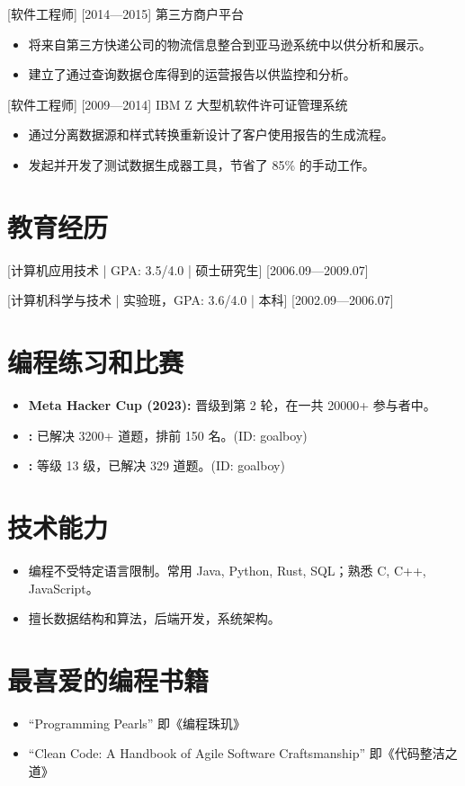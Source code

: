 \documentclass{resume}
\begin{document}
[软件工程师]
[2014—2015]
第三方商户平台
\begin{itemize}
  \item 将来自第三方快递公司的物流信息整合到亚马逊系统中以供分析和展示。
  \item 建立了通过查询数据仓库得到的运营报告以供监控和分析。
\end{itemize}

[软件工程师]
[2009—2014]
IBM Z 大型机软件许可证管理系统
\begin{itemize}
  \item 通过分离数据源和样式转换重新设计了客户使用报告的生成流程。
  \item 发起并开发了测试数据生成器工具，节省了 85\% 的手动工作。
\end{itemize}

\section{教育经历}
[\textnormal{计算机应用技术 | GPA: 3.5/4.0 |} 硕士研究生]
[2006.09—2009.07]

[\textnormal{计算机科学与技术 | 实验班，GPA: 3.6/4.0 |} 本科]
[2002.09—2006.07]

\section{编程练习和比赛}
\begin{itemize}
  \item \textbf{Meta Hacker Cup (2023):} 晋级到第 2 轮，在一共 20000+ 参与者中{}。
  \item \textbf{:} 已解决 3200+ 道题，排前 150 名。(ID: goalboy)
  \item \textbf{:} 等级 13 级，已解决 329 道题。(ID: goalboy)
\end{itemize}

\section{技术能力}
\begin{itemize}
  \item 编程不受特定语言限制。常用 Java, Python, Rust, SQL；熟悉 C, C++, JavaScript。
  \item 擅长数据结构和算法，后端开发，系统架构。
\end{itemize}

\section{最喜爱的编程书籍}
\begin{itemize}
  \item ``Programming Pearls'' 即《编程珠玑》
  \item ``Clean Code: A Handbook of Agile Software Craftsmanship'' 即《代码整洁之道》
\end{itemize}
\end{document}
